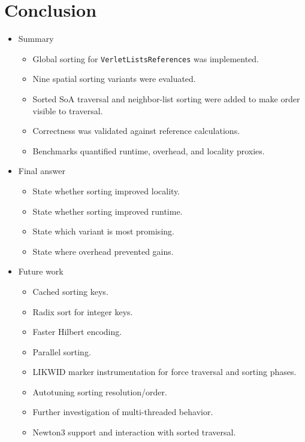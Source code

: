 \chapter{Conclusion}
\label{ch:conclusion}

\begin{itemize}
    \item Summary
    \begin{itemize}
        \item Global sorting for \texttt{VerletListsReferences} was implemented.
        \item Nine spatial sorting variants were evaluated.
        \item Sorted SoA traversal and neighbor-list sorting were added to make order visible to traversal.
        \item Correctness was validated against reference calculations.
        \item Benchmarks quantified runtime, overhead, and locality proxies.
    \end{itemize}

    \item Final answer
    \begin{itemize}
        \item State whether sorting improved locality.
        \item State whether sorting improved runtime.
        \item State which variant is most promising.
        \item State where overhead prevented gains.
    \end{itemize}

    \item Future work
    \begin{itemize}
        \item Cached sorting keys.
        \item Radix sort for integer keys.
        \item Faster Hilbert encoding.
        \item Parallel sorting.
        \item LIKWID marker instrumentation for force traversal and sorting phases.
        \item Autotuning sorting resolution/order.
        \item Further investigation of multi-threaded behavior.
        \item Newton3 support and interaction with sorted traversal.
    \end{itemize}
\end{itemize}
